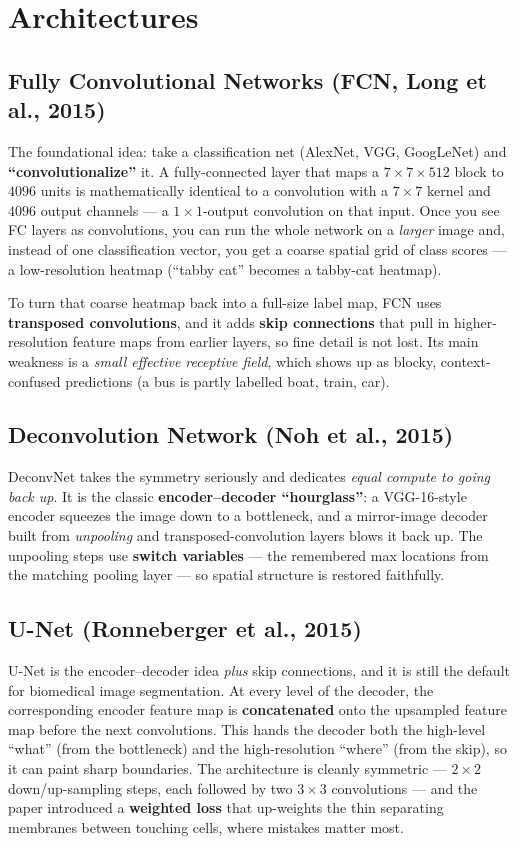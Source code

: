 \documentclass[11pt, oneside]{book}
\begin{document}
\section{Architectures}

\subsection{Fully Convolutional Networks (FCN, Long et al., 2015)}

The foundational idea: take a classification net (AlexNet, VGG, GoogLeNet) and
\textbf{``convolutionalize''} it. A fully-connected layer that maps a
$7\times7\times512$ block to $4096$ units is mathematically identical to a
convolution with a $7\times7$ kernel and $4096$ output channels --- a
$1\times1$-output convolution on that input. Once you see FC layers as
convolutions, you can run the whole network on a \emph{larger} image and, instead
of one classification vector, you get a coarse spatial grid of class scores ---
a low-resolution heatmap (``tabby cat'' becomes a tabby-cat heatmap).

To turn that coarse heatmap back into a full-size label map, FCN uses
\textbf{transposed convolutions}, and it adds \textbf{skip connections} that pull
in higher-resolution feature maps from earlier layers, so fine detail is not lost.
Its main weakness is a \emph{small effective receptive field}, which shows up as
blocky, context-confused predictions (a bus is partly labelled boat, train, car).

\subsection{Deconvolution Network (Noh et al., 2015)}

DeconvNet takes the symmetry seriously and dedicates \emph{equal compute to going
back up}. It is the classic \textbf{encoder--decoder ``hourglass''}: a VGG-16-style
encoder squeezes the image down to a bottleneck, and a mirror-image decoder built
from \emph{unpooling} and transposed-convolution layers blows it back up. The
unpooling steps use \textbf{switch variables} --- the remembered max locations from
the matching pooling layer --- so spatial structure is restored faithfully.

\subsection{U-Net (Ronneberger et al., 2015)}

U-Net is the encoder--decoder idea \emph{plus} skip connections, and it is still
the default for biomedical image segmentation. At every level of the decoder, the
corresponding encoder feature map is \textbf{concatenated} onto the upsampled
feature map before the next convolutions. This hands the decoder both the
high-level ``what'' (from the bottleneck) and the high-resolution ``where'' (from
the skip), so it can paint sharp boundaries. The architecture is cleanly
symmetric --- $2\times2$ down/up-sampling steps, each followed by two $3\times3$
convolutions --- and the paper introduced a \textbf{weighted loss} that
up-weights the thin separating membranes between touching cells, where mistakes
matter most.
\end{document}
